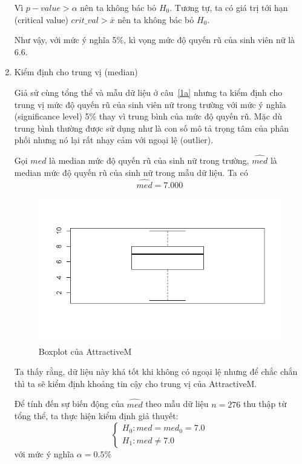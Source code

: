 \documentclass[a4paper,12pt]{article}
\begin{document}
\begin{enumerate}[label = \alph*)]
			Vì $p-value > \alpha$ nên ta không bác bỏ $H_0$. Tương tự, ta có giá trị tới hạn (critical value) $crit\_val > \bar{x}$ nên ta không bác bỏ $H_0$. 
			
			Như vậy, với mức ý nghĩa 5\%, kì vọng mức độ quyến rũ của sinh viên nữ là $6.6$. 
			
		\item Kiểm định cho trung vị (median)
		
			Giả sử cùng tổng thể và mẫu dữ liệu ở câu~\ref{1a} nhưng ta kiểm định cho trung vị mức độ quyến rũ của sinh viên nữ trong trường với mức ý nghĩa (significance level) 5\% thay vì trung bình của mức độ quyến rũ. Mặc dù trung bình thường được sử dụng như là con số mô tả trọng tâm của phân phối nhưng nó lại rất nhạy cảm với ngoại lệ (outlier).
			
			Gọi $med$ là median mức độ quyến rũ của sinh nữ trong trường, $\hat{med}$ là median mức độ quyến rũ của sinh nữ trong mẫu dữ liệu. Ta có
			$$\hat{med} = 7.000$$
			
			\begin{figure}[H]
				\centering
				\includegraphics[width=0.7\linewidth]{Rplot2}
				\caption{Boxplot của AttractiveM}
				\label{fig:rplot2}
			\end{figure}
			
			Ta thấy rằng, dữ liệu này khá tốt khi không có ngoại lệ nhưng để chắc chắn thì ta sẽ kiểm định khoảng tin cậy cho trung vị của AttractiveM.
			
			
			Để tính đến sự biến động của $\hat{med}$ theo mẫu dữ liệu $n = 276$ thu thập từ tổng thể, ta thực hiện kiểm định giả thuyết:
			\begin{equation*}
			\begin{cases}
			H_0: med = med_0 = 7.0\\
			H_1: med \neq 7.0
			\end{cases}
			\end{equation*}
			với mức ý nghĩa $\alpha = 0.5\%$
			

\end{enumerate}
\end{document}
